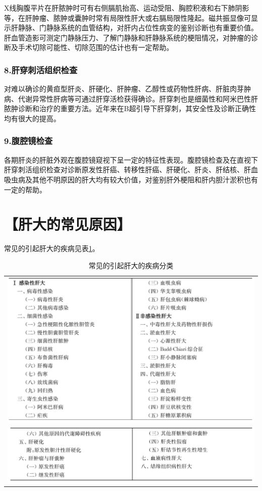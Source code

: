 X线胸腹平片在肝脓肿时可有右侧膈肌抬高、运动受阻、胸腔积液和右下肺阴影等，在肝肿瘤、脓肿或囊肿时常有局限性肝大或右膈局限性隆起。磁共振显像可显示肝静脉、门静脉系统的血管结构，对肝内占位性病变的鉴别诊断也有重要价值。肝血管造影可测定门静脉压力、了解门静脉和肝静脉系统的梗阻情况，对肿瘤的诊断及手术切除可能性、切除范围的估计也有一定帮助。

\subsubsection{8.肝穿刺活组织检查}

对难以确诊的黄疸型肝炎、肝硬化、肝肿瘤、乙醇性或药物性肝病、肝脏肉芽肿病、代谢异常性肝病等可通过肝穿活检获得确诊。肝穿刺也是细菌性和阿米巴性肝脓肿诊断和治疗的重要方法。近年来在B超引导下肝穿刺，其安全性及诊断正确性均有很大的提高。

\subsubsection{9.腹腔镜检查}

各期肝炎的肝脏外观在腹腔镜窥视下呈一定的特征性表现。腹腔镜检查及在直视下肝穿刺活组织检查对诊断原发性肝癌、转移性肝癌、肝硬化、肝炎、肝结核、肝血吸虫病及其他不明原因的肝大均有较大价值，对鉴别肝外梗阻和肝内胆汁淤积也有一定的帮助。

\section{【肝大的常见原因】}

常见的引起肝大的疾病见表\ref{tab30-1}。

\begin{longtable}{c}
 \caption{常见的引起肝大的疾病分类}
 \label{tab30-1}
 \endfirsthead
 \caption[]{常见的引起肝大的疾病分类}
 \endhead
 \includegraphics[width=\textwidth,height=\textheight,keepaspectratio]{./images/Image00156.jpg}\\
 \includegraphics[width=\textwidth,height=\textheight,keepaspectratio]{./images/Image00157.jpg}
 \end{longtable}

